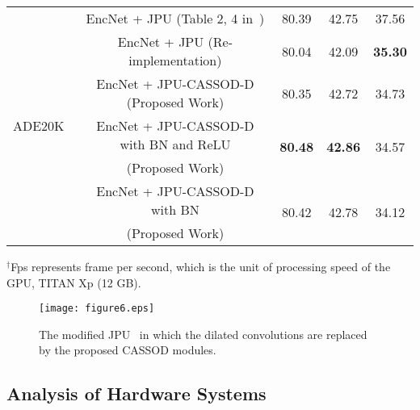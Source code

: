 \documentclass[10pt,twocolumn,letterpaper]{article}
\begin{document}
\begin{table*}
\begin{center}
\begin{tabular}{l|c|ccc}
\multirow{7}{*}{ADE20K~\cite{Zhou17}}             &  EncNet + JPU (Table 2, 4 in~\cite{Wu19})                &                         80.39   &                         42.75               & 37.56 \\
\cline{2-5}
                                                  &  EncNet + JPU (Re-implementation)                        &                         80.04   &                         42.09               & \textbf{35.30} \\
                                                  &  EncNet + JPU-CASSOD-D (Proposed Work)                   &                         80.35   &                         42.72               & 34.73 \\
                                                  &  EncNet + JPU-CASSOD-D with BN and ReLU                  & \multirow{2}{*}{\textbf{80.48}} & \multirow{2}{*}{\textbf{42.86}}             & \multirow{2}{*}{34.57} \\
                                                  & (Proposed Work)                                          &                                 &                                             & \\                
                                                  &  EncNet + JPU-CASSOD-D with BN                           &         \multirow{2}{*}{80.42}  &         \multirow{2}{*}{42.78}              & \multirow{2}{*}{34.12} \\
                                                  & (Proposed Work)                                          &                                 &                                             &\\
\hline
\end{tabular}
\end{center}
{\footnotesize
$^{\dag}$Fps represents frame per second, which is the unit of processing speed of the GPU, TITAN Xp (12 GB).\\
}
\label{tab:jpu}
\end{table*}

\begin{figure*}[t]
\begin{center}
   \texttt{[image: figure6.eps]}
\end{center}
   \caption{The modified JPU~\cite{Wu19} in which the dilated convolutions are replaced by the proposed CASSOD modules.}
\label{fig:jpu}
\end{figure*}

\subsection{Analysis of Hardware Systems}
\label{subsec:hardware}
\end{document}
